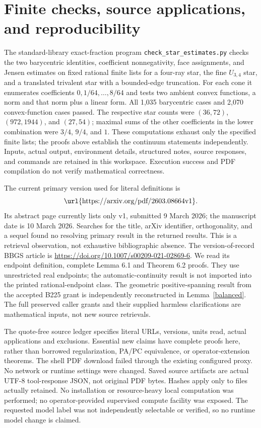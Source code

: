 \documentclass[11pt]{article}
\begin{document}
\section{Finite checks, source applications, and reproducibility}
The standard-library exact-fraction program \texttt{check\_star\_estimates.py} checks the two barycentric identities, coefficient nonnegativity, face assignments, and Jensen estimates on fixed rational finite lists for a four-ray star, the fine $U_{3,4}$ star, and a translated trivalent star with a bounded-edge truncation. For each cone it enumerates coefficients $0,1/64,\ldots,8/64$ and tests two ambient convex functions, a norm and that norm plus a linear form. All 1,035 barycentric cases and 2,070 convex-function cases passed. The respective star counts were $(36,72)$, $(972,1944)$, and $(27,54)$; maximal sums of the other coefficients in the lower combination were $3/4$, $9/4$, and $1$. These computations exhaust only the specified finite lists; the proofs above establish the continuum statements independently. Inputs, actual output, environment details, structured notes, source responses, and commands are retained in this workspace. Execution success and PDF compilation do not verify mathematical correctness.

The current primary version used for literal definitions is
\[\text{\url{https://arxiv.org/pdf/2603.08664v1}}.\]
Its abstract page currently lists only v1, submitted 9 March 2026; the manuscript date is 10 March 2026. Searches for the title, arXiv identifier, orthogonality, and a sequel found no resolving primary result in the returned results. This is a retrieval observation, not exhaustive bibliographic absence. The version-of-record BBGS article is \url{https://doi.org/10.1007/s00209-021-02869-6}. We read its endpoint definition, complete Lemma 6.1 and Theorem 6.2 proofs. They use unrestricted real endpoints; the automatic-continuity result is not imported into the printed rational-endpoint class. The geometric positive-spanning result from the accepted B225 grant is independently reconstructed in Lemma~\ref{balanced}. The full preserved caller grants and their supplied harmless clarifications are mathematical inputs, not new source retrievals.

The quote-free source ledger specifies literal URLs, versions, units read, actual applications and exclusions. Essential new claims have complete proofs here, rather than borrowed regularization, PA/PC equivalence, or operator-extension theorems. The shell PDF download failed through the existing configured proxy. No network or runtime settings were changed. Saved source artifacts are actual UTF-8 tool-response JSON, not original PDF bytes. Hashes apply only to files actually retained. No installation or resource-heavy local computation was performed; no operator-provided supervised compute facility was exposed. The requested model label was not independently selectable or verified, so no runtime model change is claimed.
\end{document}

